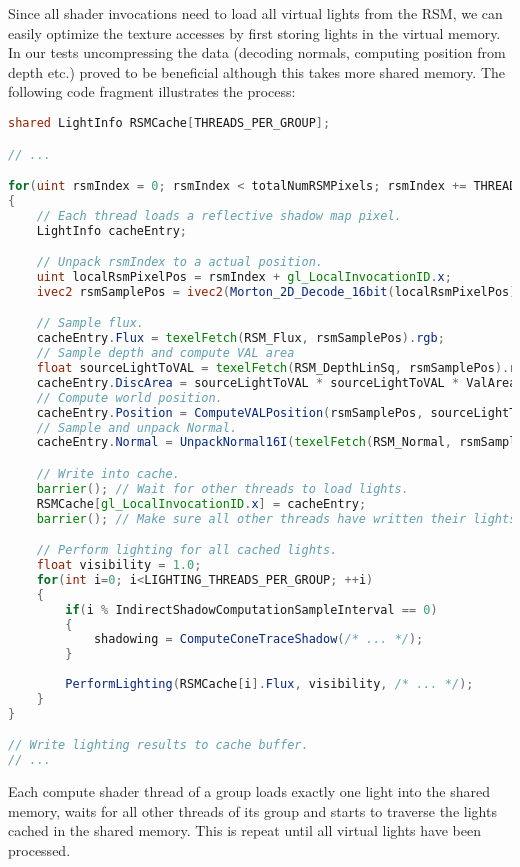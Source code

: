 \documentclass[thesis.tex]{subfiles}
\begin{document}
Since all shader invocations need to load all virtual lights from the RSM, we can easily optimize the texture accesses by first storing lights in the virtual memory.
In our tests uncompressing the data (decoding normals, computing position from depth etc.) proved to be beneficial although this takes more shared memory.
The following code fragment illustrates the process:
\begin{lstlisting}[language=GLSL]
shared LightInfo RSMCache[THREADS_PER_GROUP];

// ...

for(uint rsmIndex = 0; rsmIndex < totalNumRSMPixels; rsmIndex += THREADS_PER_GROUP)
{
	// Each thread loads a reflective shadow map pixel.
	LightInfo cacheEntry;

	// Unpack rsmIndex to a actual position.
	uint localRsmPixelPos = rsmIndex + gl_LocalInvocationID.x;
	ivec2 rsmSamplePos = ivec2(Morton_2D_Decode_16bit(localRsmPixelPos)); 

	// Sample flux.
	cacheEntry.Flux = texelFetch(RSM_Flux, rsmSamplePos).rgb;
	// Sample depth and compute VAL area
	float sourceLightToVAL = texelFetch(RSM_DepthLinSq, rsmSamplePos).r;
	cacheEntry.DiscArea = sourceLightToVAL * sourceLightToVAL * ValAreaFactor;
	// Compute world position.
	cacheEntry.Position = ComputeVALPosition(rsmSamplePos, sourceLightToVAL);
	// Sample and unpack Normal.
	cacheEntry.Normal = UnpackNormal16I(texelFetch(RSM_Normal, rsmSamplePos).xy);

	// Write into cache.
	barrier(); // Wait for other threads to load lights.
 	RSMCache[gl_LocalInvocationID.x] = cacheEntry;
	barrier(); // Make sure all other threads have written their lights.

	// Perform lighting for all cached lights.
	float visibility = 1.0;
	for(int i=0; i<LIGHTING_THREADS_PER_GROUP; ++i)
	{
		if(i % IndirectShadowComputationSampleInterval == 0)
		{
			shadowing = ComputeConeTraceShadow(/* ... */);
		}
		
		PerformLighting(RSMCache[i].Flux, visibility, /* ... */);
	}
}

// Write lighting results to cache buffer.
// ...
\end{lstlisting}
Each compute shader thread of a group loads exactly one light into the shared memory, waits for all other threads of its group and starts to traverse the lights cached in the shared memory.
This is repeat until all virtual lights have been processed.
\end{document}
